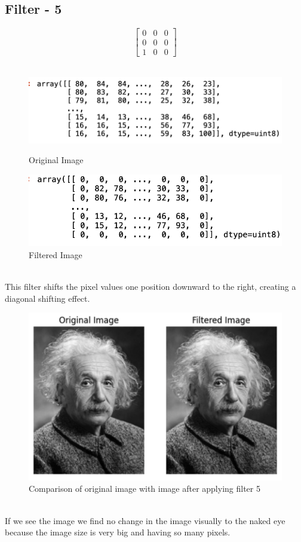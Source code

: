 \documentclass{assignment}
\begin{document}
\subsection{Filter - 5}
\[
\begin{bmatrix} 0 & 0 & 0 \\ 0 & 0 & 0 \\ 1 & 0 & 0 \end{bmatrix}
\]
\\
\begin{figure}[h]
  \begin{minipage}{0.5\textwidth}
    \centering
    \includegraphics[width=0.8\linewidth]{image.png}
    \caption{Original Image}
    \label{fig:original_image}
  \end{minipage}%
  \begin{minipage}{0.5\textwidth}
    \centering
    \includegraphics[width=0.8\linewidth]{f2.png}
    \caption{Filtered Image}
    \label{fig:filtered_image}
  \end{minipage}
\end{figure}
\\
This filter shifts the pixel values one position downward to the right, creating a diagonal shifting effect.
\\
\begin{figure}[h]
    \centering
    \includegraphics[width=0.5\linewidth]{magic.png}
    \caption{Comparison of original image with image after applying filter 5}
    \label{fig:enter-label}
\end{figure}
\\
If we see the image we  find no change in the image visually to the naked eye because the image size is very big and having so many pixels.
\end{document}
